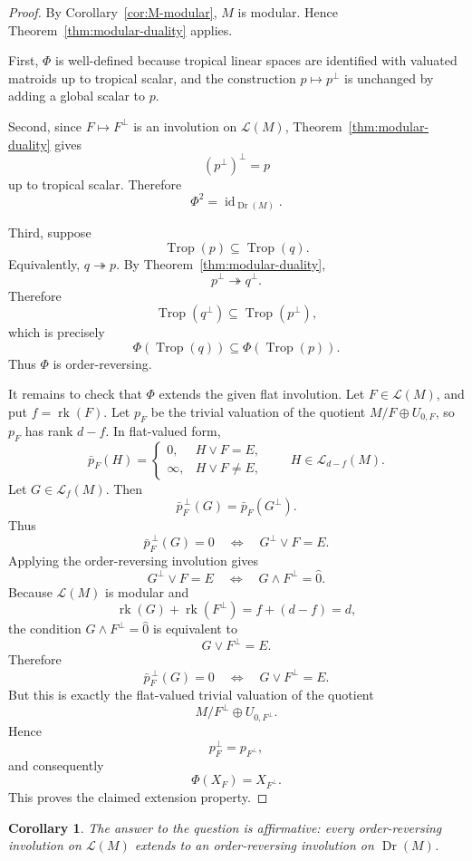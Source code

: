 \documentclass[11pt]{article}
\newcommand{\Trop}{\operatorname{Trop}}
\newcommand{\Dr}{\operatorname{Dr}}
\newcommand{\rk}{\operatorname{rk}}
\newcommand{\cL}{\mathcal L}
\theoremstyle{plain}
\newtheorem{corollary}[theorem]{Corollary}
\theoremstyle{definition}
\begin{document}
\begin{proof}
By Corollary~\ref{cor:M-modular}, \(M\) is modular.  Hence Theorem~\ref{thm:modular-duality} applies.

First, \(\Phi\) is well-defined because tropical linear spaces are identified with valuated matroids up to tropical scalar, and the construction \(p\mapsto p^\perp\) is unchanged by adding a global scalar to \(p\).

Second, since \(F\mapsto F^\perp\) is an involution on \(\cL(M)\), Theorem~\ref{thm:modular-duality} gives
\[
   (p^\perp)^\perp=p
\]
up to tropical scalar.  Therefore
\[
   \Phi^2=\operatorname{id}_{\Dr(M)}.
\]

Third, suppose
\[
   \Trop(p)\subseteq \Trop(q).
\]
Equivalently, \(q\twoheadrightarrow p\).  By Theorem~\ref{thm:modular-duality},
\[
   p^\perp\twoheadrightarrow q^\perp.
\]
Therefore
\[
   \Trop(q^\perp)\subseteq \Trop(p^\perp),
\]
which is precisely
\[
   \Phi(\Trop(q))\subseteq \Phi(\Trop(p)).
\]
Thus \(\Phi\) is order-reversing.

It remains to check that \(\Phi\) extends the given flat involution.  Let \(F\in\cL(M)\), and put \(f=\rk(F)\).  Let \(p_F\) be the trivial valuation of the quotient \(M/F\oplus U_{0,F}\), so \(p_F\) has rank \(d-f\).  In flat-valued form,
\[
   \bar p_F(H)=
   \begin{cases}
   0, & H\vee F=E,\\
   \infty, & H\vee F\ne E,
   \end{cases}
   \qquad H\in \cL_{d-f}(M).
\]
Let \(G\in\cL_f(M)\).  Then
\[
   \bar p_F^{\,\perp}(G)
   =
   \bar p_F(G^\perp).
\]
Thus
\[
   \bar p_F^{\,\perp}(G)=0
   \quad\Longleftrightarrow\quad
   G^\perp\vee F=E.
\]
Applying the order-reversing involution gives
\[
   G^\perp\vee F=E
   \quad\Longleftrightarrow\quad
   G\wedge F^\perp=\hat 0.
\]
Because \(\cL(M)\) is modular and
\[
   \rk(G)+\rk(F^\perp)=f+(d-f)=d,
\]
the condition \(G\wedge F^\perp=\hat 0\) is equivalent to
\[
   G\vee F^\perp=E.
\]
Therefore
\[
   \bar p_F^{\,\perp}(G)=0
   \quad\Longleftrightarrow\quad
   G\vee F^\perp=E.
\]
But this is exactly the flat-valued trivial valuation of the quotient
\[
   M/F^\perp\oplus U_{0,F^\perp}.
\]
Hence
\[
   p_F^\perp=p_{F^\perp},
\]
and consequently
\[
   \Phi(X_F)=X_{F^\perp}.
\]
This proves the claimed extension property.
\end{proof}

\begin{corollary}
The answer to the question is affirmative: every order-reversing involution on \(\cL(M)\) extends to an order-reversing involution on \(\Dr(M)\).
\end{corollary}
\end{document}
